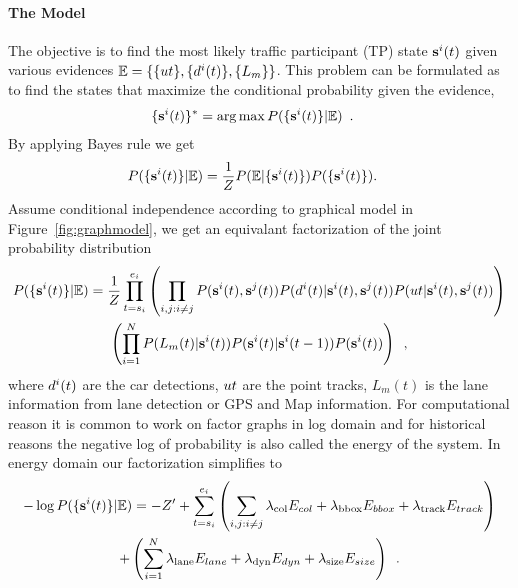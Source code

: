 \begin{figure}
  \centering
\end{figure}


\paragraph{The Model}

The objective is to find the most likely traffic participant (TP) state $\mathbf{s}^{i}(t)$ given
various evidences $\mathbb{E} = \{\{ut\}, \{d^{i}(t)\}, \{L_m\}\}$. This problem can be formulated as to find the states that maximize the conditional probability given the evidence,
%
\begin{align}
  \{\mathbf{s}^{i}(t)\}^* &= \arg \max P(\{\mathbf{s}^{i}(t)\} | \mathbb{E})\enspace.
\end{align}
%
By applying Bayes rule we get
\begin{align}
  P(\{\mathbf{s}^{i}(t)\} | \mathbb{E}) &=
  \frac{1}{Z}P( \mathbb{E} | \{\mathbf{s}^{i}(t)\})P(\{\mathbf{s}^{i}(t)\}).
\end{align}
%
Assume conditional independence according to graphical model in Figure~\ref{fig:graphmodel}, we get an equivalant factorization of the joint probability distribution
%
\begin{multline}
  P(\{\mathbf{s}^{i}(t)\} | \mathbb{E}) =
  \frac{1}{Z}
  \prod_{t=s_i}^{e_i}
  \left(
  \prod_{i,j: i \ne j}
  P(\mathbf{s}^{i}(t), \mathbf{s}^{j}(t))
  P(d^{i}(t) | \mathbf{s}^{i}(t), \mathbf{s}^{j}(t))
  P(ut | \mathbf{s}^{i}(t), \mathbf{s}^{j}(t))
\right)
\\
\left(
  \prod_{i=1}^{N}
  P(L_m(t) | \mathbf{s}^{i}(t))
  P(\mathbf{s}^{i}(t) | \mathbf{s}^{i}(t-1))
  P(\mathbf{s}^{i}(t))
\right)
  \enspace ,
\end{multline}
where $d^{i}(t)$ are the car detections, $ut$ are the point tracks, $L_m(t)$ is the lane information from lane detection or GPS and Map information.
For computational reason it is common to work on factor graphs in log domain
and for historical reasons the negative log of probability is also called the energy of the system. In energy domain our factorization simplifies to
%
\begin{multline}
  -\log{P(\{\mathbf{s}^{i}(t)\} | \mathbb{E})} = 
  -Z' 
  + \sum_{t=s_i}^{e_i}
  \left(
  \sum_{i,j:i\ne j}   
  \lambda_{\text{col}}E_{col} 
   + \lambda_{\text{bbox}}E_{bbox}
   + \lambda_{\text{track}}E_{track}
\right)
  \\
  + \left(
  \sum_{i=1}^N 
  \lambda_{\text{lane}}E_{lane}
  + \lambda_{\text{dyn}}E_{dyn}
  + \lambda_{\text{size}}E_{size}
\right)
  \enspace.
\end{multline}
